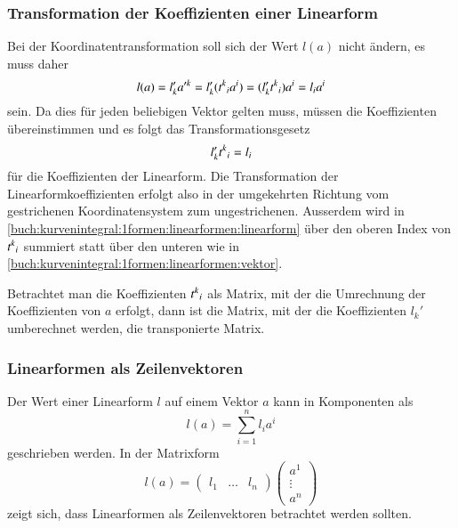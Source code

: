 \subsubsection{Transformation der Koeffizienten einer Linearform}
Bei der Koordinatentransformation soll sich der Wert $l(a)$ nicht
ändern, es muss daher
\[
l(a)
=
l'_k
a'^k
=
l'_k
(t^k\mathstrut _i a^i)
=
(l'_kt^k\mathstrut_i) a^i
=
l_i
a^i
\]
sein.
Da dies für jeden beliebigen Vektor gelten muss, müssen die Koeffizienten
übereinstimmen und es folgt das Transformationsgesetz
\begin{equation}
l'_kt^k\mathstrut_i
=
l_i
\label{buch:kurvenintegral:1formen:linearformen:linearform}
\end{equation}
für die Koeffizienten der Linearform.
Die Transformation der Linearformkoeffizienten erfolgt also
in der umgekehrten Richtung vom gestrichenen Koordinatensystem 
zum ungestrichenen.
Ausserdem wird in \eqref{buch:kurvenintegral:1formen:linearformen:linearform}
über den oberen Index von $t^k\mathstrut_i$ summiert statt über
den unteren wie in 
\eqref{buch:kurvenintegral:1formen:linearformen:vektor}.

Betrachtet man die Koeffizienten $t^k\mathstrut_i$ als Matrix, mit der
die Umrechnung der Koeffizienten von $a$ erfolgt, dann ist die Matrix,
mit der die Koeffizienten $l_k'$ umberechnet werden, die transponierte
Matrix.

%
%
\subsubsection{Linearformen als Zeilenvektoren}
Der Wert einer Linearform $l$ auf einem Vektor $a$ kann in Komponenten
als
\[
l(a) = \sum_{i=1}^n l_ia^i
\]
geschrieben werden.
In der Matrixform
\[
l(a)
=
\begin{pmatrix}l_1&\dots&l_n\end{pmatrix}
\begin{pmatrix}
a^1\\[-2pt]
\vdots\\
a^n
\end{pmatrix}
\]
zeigt sich, dass Linearformen als Zeilenvektoren betrachtet werden
sollten.

